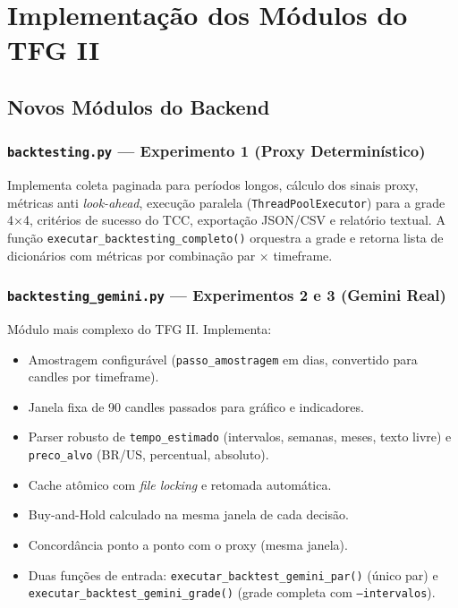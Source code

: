 \documentclass[conference]{IEEEtran}
\begin{document}
\section{Implementação dos Módulos do TFG II}
\label{sec:implementacao}

\subsection{Novos Módulos do Backend}

\subsubsection{\texttt{backtesting.py} — Experimento 1 (Proxy Determinístico)}

Implementa coleta paginada para períodos longos, cálculo dos sinais proxy, métricas anti \textit{look-ahead}, execução paralela (\texttt{ThreadPoolExecutor}) para a grade 4×4, critérios de sucesso do TCC, exportação JSON/CSV e relatório textual. A função \texttt{executar\_backtesting\_completo()} orquestra a grade e retorna lista de dicionários com métricas por combinação par × timeframe.

\subsubsection{\texttt{backtesting\_gemini.py} — Experimentos 2 e 3 (Gemini Real)}

Módulo mais complexo do TFG II. Implementa:
\begin{itemize}
  \item Amostragem configurável (\texttt{passo\_amostragem} em dias, convertido para candles por timeframe).
  \item Janela fixa de 90 candles passados para gráfico e indicadores.
  \item Parser robusto de \texttt{tempo\_estimado} (intervalos, semanas, meses, texto livre) e \texttt{preco\_alvo} (BR/US, percentual, absoluto).
  \item Cache atômico com \textit{file locking} e retomada automática.
  \item Buy-and-Hold calculado na mesma janela de cada decisão.
  \item Concordância ponto a ponto com o proxy (mesma janela).
  \item Duas funções de entrada: \texttt{executar\_backtest\_gemini\_par()} (único par) e \texttt{executar\_backtest\_gemini\_grade()} (grade completa com \texttt{--intervalos}).
\end{itemize}
\end{document}
